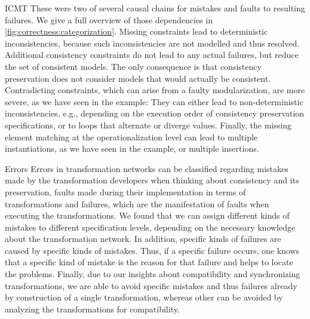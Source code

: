 \begin{copiedFrom}{ICMT}
These were two of several causal chains for mistakes and faults to resulting failures.
We give a full overview of those dependencies in \autoref{fig:correctness:categorization}.
Missing constraints lead to deterministic inconsistencies, because such inconsistencies are not modelled and thus resolved.
Additional consistency constraints do not lead to any actual failures, but reduce the set of consistent models. 
The only consequence is that consistency preservation does not consider models that would actually be consistent.
Contradicting constraints, which can arise from a faulty modularization, are more severe, as we have seen in the example:
They can either lead to non-deterministic inconsistencies, e.g., depending on the execution order of consistency preservation specifications, or to loops that alternate or diverge values.
Finally, the missing element matching at the operationalization level can lead to multiple instantiations, as we have seen in the example, or multiple insertions. %



\end{copiedFrom} %


\begin{insight}{Errors}
    Errors in transformation networks can be classified regarding mistakes made by the transformation developers when thinking about consistency and its preservation, faults made during their implementation in terms of transformations and failures, which are the manifestation of faults when executing the transformations.
    We found that we can assign different kinds of mistakes to different specification levels, depending on the necessary knowledge about the transformation network.
    In addition, specific kinds of failures are caused by specific kinds of mistakes.
    Thus, if a specific failure occurs, one knows that a specific kind of mistake is the reason for that failure and helps to locate the problems.
    Finally, due to our insights about compatibility and synchronizing transformations, we are able to avoid specific mistakes and thus failures already by construction of a single transformation, whereas other can be avoided by analyzing the transformations for compatibility.
\end{insight}